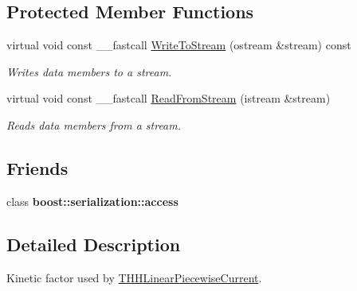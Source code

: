 \subsection*{Protected Member Functions}
\begin{DoxyCompactItemize}
\item 
\hypertarget{class_t_h_h_linear_piecewise_kinetics_factor_ad3fc61149df1a12c58e7c3f5df3bd52c}{virtual void const \+\_\+\+\_\+fastcall \hyperlink{class_t_h_h_linear_piecewise_kinetics_factor_ad3fc61149df1a12c58e7c3f5df3bd52c}{Write\+To\+Stream} (ostream \&stream) const }\label{class_t_h_h_linear_piecewise_kinetics_factor_ad3fc61149df1a12c58e7c3f5df3bd52c}

\begin{DoxyCompactList}\small\item\em Writes data members to a stream. \end{DoxyCompactList}\item 
\hypertarget{class_t_h_h_linear_piecewise_kinetics_factor_ad6fa7a818f89fc488d06af4af2f9f1f6}{virtual void const \+\_\+\+\_\+fastcall \hyperlink{class_t_h_h_linear_piecewise_kinetics_factor_ad6fa7a818f89fc488d06af4af2f9f1f6}{Read\+From\+Stream} (istream \&stream)}\label{class_t_h_h_linear_piecewise_kinetics_factor_ad6fa7a818f89fc488d06af4af2f9f1f6}

\begin{DoxyCompactList}\small\item\em Reads data members from a stream. \end{DoxyCompactList}\end{DoxyCompactItemize}
\subsection*{Friends}
\begin{DoxyCompactItemize}
\item 
\hypertarget{class_t_h_h_linear_piecewise_kinetics_factor_ac98d07dd8f7b70e16ccb9a01abf56b9c}{class {\bfseries boost\+::serialization\+::access}}\label{class_t_h_h_linear_piecewise_kinetics_factor_ac98d07dd8f7b70e16ccb9a01abf56b9c}

\end{DoxyCompactItemize}


\subsection{Detailed Description}
Kinetic factor used by \hyperlink{class_t_h_h_linear_piecewise_current}{T\+H\+H\+Linear\+Piecewise\+Current}. 


